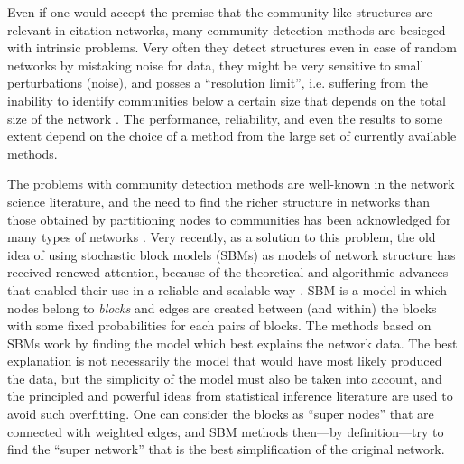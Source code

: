 \documentclass[a4paper,12pt]{article}
\begin{document}
Even if one would accept the premise that the community-like structures are relevant in citation networks, many community detection methods are besieged with intrinsic problems. Very often they detect structures even in case of random networks by mistaking noise for data, they might be very sensitive to small perturbations (noise), and posses a 
``resolution limit'', i.e. suffering from the inability to identify communities below a certain size that  depends on the total size of the network \citep{Guimera2004, Fortunato2007}. The performance, reliability, and even the results to some extent depend on the 
choice of a method from the large set of currently available methods.



The problems with community detection methods are well-known in the network science literature, and the need to find the richer structure in networks than 
those obtained by partitioning nodes to communities has been acknowledged for many types of networks \citep{Palla2005,Leskovec2009,Wang2010,Xie2013,Rombach2014Core}.
Very recently, as a solution to this problem, the old idea of using stochastic block models (SBMs) as models of network structure
\citep{Lorrain1971,Holland1983,Wasserman1987} has received renewed attention, because of the theoretical and algorithmic advances that enabled their use in a reliable and scalable way
\citep{Bianconi2009,Karrer2011,Peixoto2012}. 
SBM is a model in which nodes belong to \emph{blocks} and edges are created between (and within) the blocks with some fixed probabilities for each pairs of blocks. The methods based on SBMs work by finding the model which best explains the network data. 
The best explanation is not necessarily the model that would have most likely produced the data, but the simplicity of the model must also be taken into account, and 
the principled and powerful ideas from statistical inference literature are used to avoid such overfitting. 
One can consider the blocks as ``super nodes'' that are connected with weighted edges, and SBM methods then---by definition---try to find the ``super network'' that is the best simplification of the original network.
\end{document}
